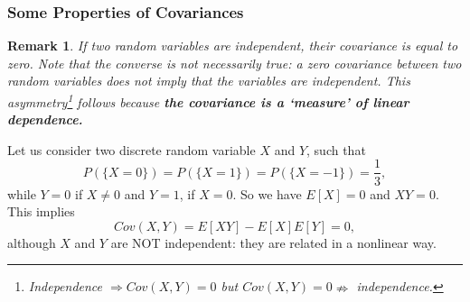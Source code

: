 \documentclass[notes=show,handout]{beamer}\usepackage[]{graphicx}\usepackage[]{color}
\newtheorem{remark}{Remark}[section]
\begin{document}
\begin{frame}%

\frametitle{Some Properties of Covariances}
\begin{small}
\begin{remark}
 If two random variables are independent, their covariance is equal to
zero. Note that the converse is not necessarily true: a zero covariance
between two random variables does not imply that the variables are
independent. This asymmetry\footnote{Independence $\Rightarrow Cov(X,Y)=0$ but $Cov(X,Y)=0\nRightarrow$ independence.} follows because \textbf{the covariance is  a `measure' of linear dependence.}
\end{remark}
\begin{example}

Let us consider two discrete random variable $X$ and $Y$, such that
$$
P(\{X=0\})=P(\{X=1\})=P(\{X=-1\})=\frac{1}{3},
$$
while $Y=0$ if $X\neq 0$ and $Y=1$, if $X=0$. So we have $E[X]=0$ and $XY=0$. This implies
$$
Cov(X,Y) = E[XY] -E[X]E[Y] =0,
$$
although $X$ and $Y$ are NOT independent: they are related in a nonlinear way.

\end{example}
\end{small}

\end{frame}
\end{document}
